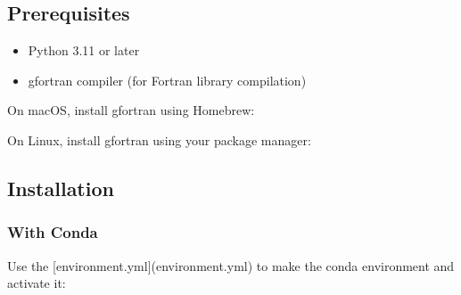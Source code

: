 \documentclass[letterpaper,10pt,english]{sphinxmanual}
\begin{document}
\subsection{Prerequisites}
\label{\detokenize{installation:prerequisites}}\begin{itemize}
\item {} 
\sphinxAtStartPar
Python 3.11 or later

\item {} 
\sphinxAtStartPar
gfortran compiler (for Fortran library compilation)

\end{itemize}

\sphinxAtStartPar
On macOS, install gfortran using Homebrew:

\begin{sphinxVerbatim}[commandchars=\\\{\}]
  
\end{sphinxVerbatim}

\sphinxAtStartPar
On Linux, install gfortran using your package manager:

\begin{sphinxVerbatim}[commandchars=\\\{\}]
   

     
\end{sphinxVerbatim}


\subsection{Installation}
\label{\detokenize{installation:id2}}

\subsubsection{With Conda}
\label{\detokenize{installation:with-conda}}
\sphinxAtStartPar
Use the {[}environment.yml{]}(environment.yml) to make the conda environment and activate it:

\begin{sphinxVerbatim}[commandchars=\\\{\}]
     
  
\end{sphinxVerbatim}
\end{document}
